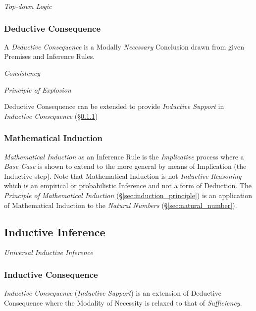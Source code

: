 \emph{Top-down Logic}

\subsubsection{Deductive Consequence}\label{sec:deductive_consequence}

A \emph{Deductive Consequence} is a Modally \emph{Necessary}
Conclusion drawn from given Premises and Inference Rules.

\emph{Consistency}

\emph{Principle of Explosion}

Deductive Consequence can be extended to provide \emph{Inductive
  Support} in \emph{Inductive Consequence}
(\S\ref{sec:inductive_consequence})



\subsubsection{Mathematical Induction}\label{sec:mathematical_induction}

\emph{Mathematical Induction} as an Inference Rule is the
\emph{Implicative} process where a \emph{Base Case} is shown to extend
to the more general by means of Implication (the Inductive step). Note
that Mathematical Induction is not \emph{Inductive Reasoning} which is
an empirical or probabilistic Inference and not a form of Deduction.
The \emph{Principle of Mathematical Induction}
(\S\ref{sec:induction_principle}) is an application of Mathematical
Induction to the \emph{Natural Numbers} (\S\ref{sec:natural_number}).



\subsection{Inductive Inference}\label{sec:inductive_inference}
\cite{hawthorne08}

\emph{Universal Inductive Inference}



\subsubsection{Inductive Consequence}\label{sec:inductive_consequence}

\emph{Inductive Consequence} (\emph{Inductive Support}) is an
extension of Deductive Consequence where the Modality of Necessity is
relaxed to that of \emph{Sufficiency}.



